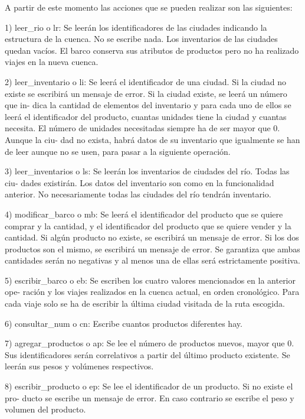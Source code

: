 A partir de este momento las acciones que se pueden realizar son las siguientes\+:

1) leer\+\_\+rio o lr\+: Se leerán los identificadores de las ciudades indicando la estructura de la cuenca. No se escribe nada. Los inventarios de las ciudades quedan vacíos. El barco conserva sus atributos de productos pero no ha realizado viajes en la nueva cuenca.

2) leer\+\_\+inventario o li\+: Se leerá el identificador de una ciudad. Si la ciudad no existe se escribirá un mensaje de error. Si la ciudad existe, se leerá un número que in-\/ dica la cantidad de elementos del inventario y para cada uno de ellos se leerá el identificador del producto, cuantas unidades tiene la ciudad y cuantas necesita. El número de unidades necesitadas siempre ha de ser mayor que 0. Aunque la ciu-\/ dad no exista, habrá datos de su inventario que igualmente se han de leer aunque no se usen, para pasar a la siguiente operación.

3) leer\+\_\+inventarios o ls\+: Se leerán los inventarios de ciudades del río. Todas las ciu-\/ dades existirán. Los datos del inventario son como en la funcionalidad anterior. No necesariamente todas las ciudades del río tendrán inventario.

4) modificar\+\_\+barco o mb\+: Se leerá el identificador del producto que se quiere comprar y la cantidad, y el identificador del producto que se quiere vender y la cantidad. Si algún producto no existe, se escribirá un mensaje de error. Si los dos productos son el mismo, se escribirá un mensaje de error. Se garantiza que ambas cantidades serán no negativas y al menos una de ellas será estrictamente positiva.

5) escribir\+\_\+barco o eb\+: Se escriben los cuatro valores mencionados en la anterior ope-\/ ración y los viajes realizados en la cuenca actual, en orden cronológico. Para cada viaje solo se ha de escribir la última ciudad visitada de la ruta escogida.

6) consultar\+\_\+num o cn\+: Escribe cuantos productos diferentes hay.

7) agregar\+\_\+productos o ap\+: Se lee el número de productos nuevos, mayor que 0. Sus identificadores serán correlativos a partir del último producto existente. Se leerán sus pesos y volúmenes respectivos.

8) escribir\+\_\+producto o ep\+: Se lee el identificador de un producto. Si no existe el pro-\/ ducto se escribe un mensaje de error. En caso contrario se escribe el peso y volumen del producto.

